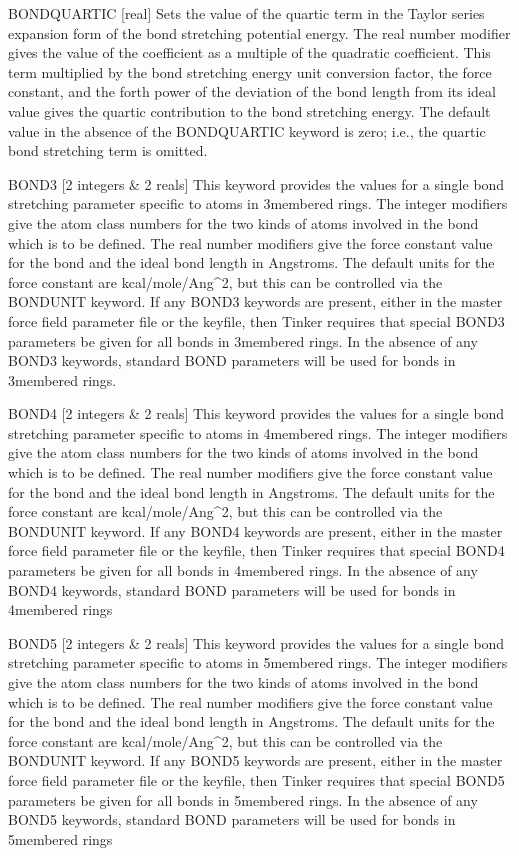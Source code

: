 \documentclass[letterpaper,11pt,english]{sphinxmanual}
\begin{document}
BOND\sphinxhyphen{}QUARTIC {[}real{]}     Sets the value of the quartic term in the Taylor series expansion form of the bond stretching potential energy. The real number modifier gives the value of the coefficient as a multiple of the quadratic coefficient. This term multiplied by the bond stretching energy unit conversion factor, the force constant, and the forth power of the deviation of the bond length from its ideal value gives the quartic contribution to the bond stretching energy. The default value in the absence of the BOND\sphinxhyphen{}QUARTIC keyword is zero; i.e., the quartic bond stretching term is omitted.

BOND3 {[}2 integers \& 2 reals{]}     This keyword provides the values for a single bond stretching parameter specific to atoms in 3\sphinxhyphen{}membered rings. The integer modifiers give the atom class numbers for the two kinds of atoms involved in the bond which is to be defined. The real number modifiers give the force constant value for the bond and the ideal bond length in Angstroms. The default units for the force constant are kcal/mole/Ang\textasciicircum{}2, but this can be controlled via the BONDUNIT keyword. If any BOND3 keywords are present, either in the master force field parameter file or the keyfile, then Tinker requires that special BOND3 parameters be given for all bonds in 3\sphinxhyphen{}membered rings. In the absence of any BOND3 keywords, standard BOND parameters will be used for bonds in 3\sphinxhyphen{}membered rings.

BOND4 {[}2 integers \& 2 reals{]}     This keyword provides the values for a single bond stretching parameter specific to atoms in 4\sphinxhyphen{}membered rings. The integer modifiers give the atom class numbers for the two kinds of atoms involved in the bond which is to be defined. The real number modifiers give the force constant value for the bond and the ideal bond length in Angstroms. The default units for the force constant are kcal/mole/Ang\textasciicircum{}2, but this can be controlled via the BONDUNIT keyword. If any BOND4 keywords are present, either in the master force field parameter file or the keyfile, then Tinker requires that special BOND4 parameters be given for all bonds in 4\sphinxhyphen{}membered rings. In the absence of any BOND4 keywords, standard BOND parameters will be used for bonds in 4\sphinxhyphen{}membered rings

BOND5 {[}2 integers \& 2 reals{]}     This keyword provides the values for a single bond stretching parameter specific to atoms in 5\sphinxhyphen{}membered rings. The integer modifiers give the atom class numbers for the two kinds of atoms involved in the bond which is to be defined. The real number modifiers give the force constant value for the bond and the ideal bond length in Angstroms. The default units for the force constant are kcal/mole/Ang\textasciicircum{}2, but this can be controlled via the BONDUNIT keyword. If any BOND5 keywords are present, either in the master force field parameter file or the keyfile, then Tinker requires that special BOND5 parameters be given for all bonds in 5\sphinxhyphen{}membered rings. In the absence of any BOND5 keywords, standard BOND parameters will be used for bonds in 5\sphinxhyphen{}membered rings
\end{document}
